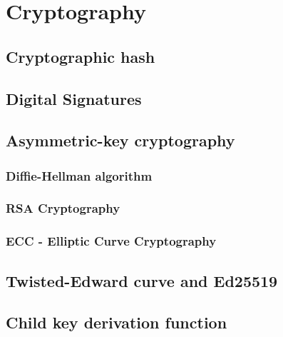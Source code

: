\section{Cryptography}

\subsection{Cryptographic hash}
\label{sec:crypto_hash}

\subsection{Digital Signatures}
\label{sec:digital_signatures}

\subsection{Asymmetric-key cryptography}
\label{sec:asymmetric_cryptography}

\subsubsection{Diffie-Hellman algorithm}

\subsubsection{RSA Cryptography}

\subsubsection{ECC - Elliptic Curve Cryptography}

\subsection{Twisted-Edward curve and Ed25519}

\subsection{Child key derivation function}
